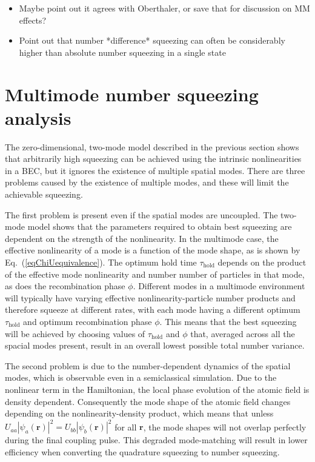 \documentclass{iopart}
\begin{document}
\begin{itemize}
  \item Maybe point out it agrees with Oberthaler, or save that for discussion on MM effects?
  \item Point out that number *difference* squeezing can often be considerably higher than absolute number squeezing in a single state
\end{itemize}


\section{Multimode number squeezing analysis} \label{sec:MMdescription}

The zero-dimensional, two-mode model described in the previous section shows that arbitrarily high squeezing can be achieved using the intrinsic nonlinearities in a BEC, but it ignores the existence of multiple spatial modes.  There are three problems caused by the existence of multiple modes, and these will limit the achievable squeezing.

The first problem is present even if the spatial modes are uncoupled.  The two-mode model shows that the parameters required to obtain best squeezing are dependent on the strength of the nonlinearity. In the multimode case, the effective nonlinearity of a mode is a function of the mode shape, as is shown by Eq.~(\ref{eqChiUequivalence}). The optimum hold time $\tau_{\mathrm{hold}}$ depends on the product of the effective mode nonlinearity and number number of particles in that mode, as does the recombination phase $\phi$.  Different modes in a multimode environment will typically have varying effective nonlinearity-particle number products and therefore squeeze at different rates, with each mode having a different optimum $\tau_{\mathrm{hold}}$ and optimum recombination phase $\phi$. This means that the best squeezing will be achieved by choosing values of $\tau_{\mathrm{hold}}$ and $\phi$ that, averaged across all the spacial modes present, result in an overall lowest possible total number variance.  

The second problem is due to the number-dependent dynamics of the spatial modes, which is observable even in a semiclassical simulation.  Due to the nonlinear term in the Hamiltonian, the local phase evolution of the atomic field is density dependent.  Consequently the mode shape of the atomic field changes depending on the nonlinearity-density product, which means that unless $U_{aa}|\psi_a({\mathbf{r}})|^2 = U_{bb}|\psi_b({\mathbf{r}})|^2$ for all ${\mathbf{r}}$, the mode shapes will not overlap perfectly during the final coupling pulse. This degraded mode-matching will result in lower efficiency when converting the quadrature squeezing to number squeezing. 
\end{document}

